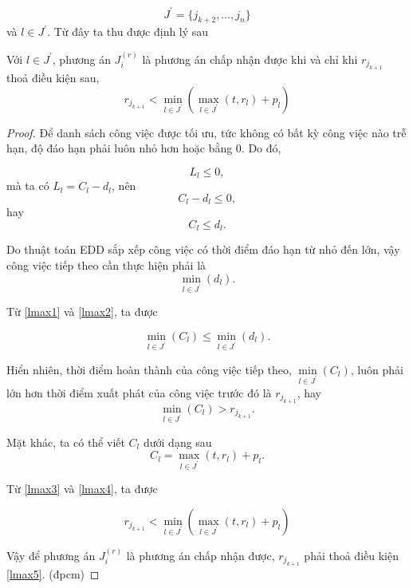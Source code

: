 \begin{equation*}
J^{'} = \{j_{k+2},\ldots , j_{n}\}
\end{equation*}
và $l \in J^{'}$. Từ đây ta thu được định lý sau

\begin{dl}
	Với $l \in J^{'}$, phương án $J_i^{(r)}$ là phương án chấp nhận được khi và chỉ khi $r_{j_{k+1}}$ thoả điều kiện sau,
	\begin{equation} \label{dllmax1}
		r_{j_{k+1}} < \underset{l \in J^{'}}{\min} (\underset{l \in J^{'}}{\max} (t, r_l) + p_l)
	\end{equation}
\end{dl}

\begin{proof}

\phantom{}

Để danh sách công việc được tối ưu, tức không có bất kỳ công việc nào trễ hạn, độ đáo hạn phải luôn nhỏ hơn hoặc bằng 0. Do đó,

\begin{equation*}
	L_l \leq 0,
\end{equation*}
mà ta có $L_l = C_l - d_l$, nên
\begin{equation*}
	C_l - d_l \leq 0,
\end{equation*}
hay
\begin{equation} \label{lmax1}
	C_l \leq d_l.
\end{equation}

Do thuật toán EDD sắp xếp công việc có thời điểm đáo hạn từ nhỏ đến lớn, vậy công việc tiếp theo cần thực hiện phải là 
\begin{equation} \label{lmax2}
\underset{l \in J^{'}}{\min} (d_l).
\end{equation}

Từ \eqref{lmax1} và \eqref{lmax2}, ta được

\begin{equation}
	\underset{l \in J^{'}}{\min} (C_l) \leq \underset{l \in J^{'}}{\min} (d_l).
\end{equation}

Hiển nhiên, thời điểm hoàn thành của công việc tiếp theo, $\underset{l \in J^{'}}{\min}(C_l)$, luôn phải lớn hơn thời điểm xuất phát của công việc trước đó là $r_{j_{k+1}}$, hay
\begin{equation} \label{lmax3}
	\underset{l \in J^{'}}{\min} (C_l) > r_{j_{k+1}}.
\end{equation}

Mặt khác, ta có thể viết $C_l$ dưới dạng sau
\begin{equation} \label{lmax4}
	C_l = \underset{l \in J^{'}}{\max} (t, r_l) + p_l.
\end{equation}

Từ \eqref{lmax3} và \eqref{lmax4}, ta được

\begin{equation} \label{lmax5}
	r_{j_{k+1}} < \underset{l \in J^{'}}{\min} (\underset{l \in J^{'}}{\max} (t, r_l) + p_l)
\end{equation}

Vậy để phương án $J_i^{(r)}$ là phương án chấp nhận được, $r_{j_{k+1}}$ phải thoả điều kiện \eqref{lmax5}. (đpcm)
\end{proof}

